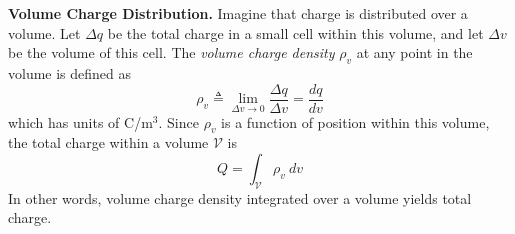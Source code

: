 {\bf Volume Charge Distribution.} 
Imagine that charge is distributed over a volume.   
Let $\Delta q$ be the total charge in a small cell within this volume, and let $\Delta v$ be the volume of this cell.
The \emph{volume charge density} $\rho_v$ at any point in the volume is defined as
%
\begin{equation}
\rho_v \triangleq \lim_{\Delta v \to 0} \frac{\Delta q}{\Delta v} = \frac{dq}{dv}
\end{equation}
%
which has units of C/m$^3$.
Since $\rho_v$ is a function of position within this volume, the total charge within a volume ${\mathcal V}$ is
%
\begin{equation}
Q = \int_{\mathcal V} \rho_v~dv
\end{equation}
%
In other words, volume charge density integrated over a volume yields total charge.

